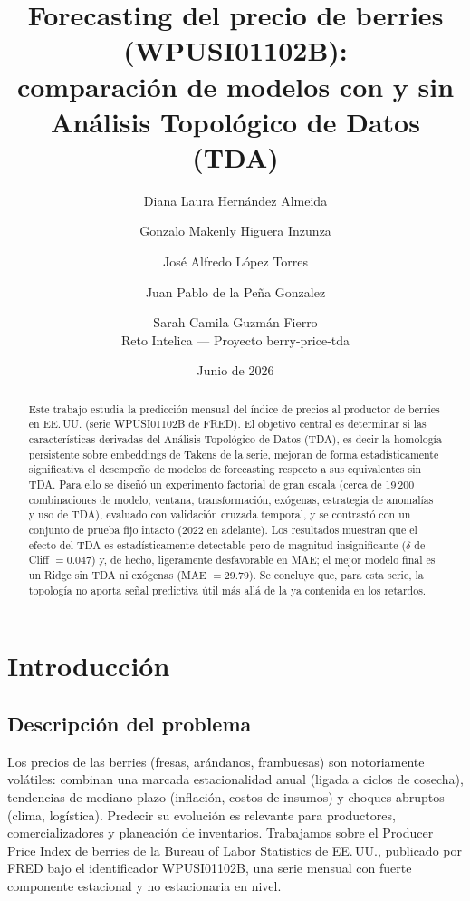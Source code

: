 \documentclass[11pt,a4paper]{article}
\title{Forecasting del precio de berries (WPUSI01102B):\\
comparación de modelos con y sin Análisis Topológico de Datos (TDA)}
\author{Diana Laura Hernández Almeida \and Gonzalo Makenly Higuera Inzunza \and
José Alfredo López Torres \and Juan Pablo de la Peña Gonzalez \and
Sarah Camila Guzmán Fierro \\[0.5em] Reto Intelica --- Proyecto berry-price-tda}
\date{Junio de 2026}
\begin{document}
\maketitle

\begin{abstract}
\noindent
Este trabajo estudia la predicción mensual del índice de precios al productor
de berries en EE.\,UU. (serie WPUSI01102B de FRED). El objetivo central es
determinar si las características derivadas del Análisis Topológico de Datos
(TDA), es decir la homología persistente sobre embeddings de Takens de la serie,
mejoran de forma estadísticamente significativa el desempeño de modelos de
forecasting respecto a sus equivalentes sin TDA. Para ello se diseñó un
experimento factorial de gran escala (cerca de 19\,200 combinaciones de modelo,
ventana, transformación, exógenas, estrategia de anomalías y uso de TDA),
evaluado con validación cruzada temporal, y se contrastó con un conjunto de
prueba fijo intacto (2022 en adelante). Los resultados muestran que el efecto del
TDA es estadísticamente detectable pero de magnitud insignificante
($\delta$ de Cliff $=0.047$) y, de hecho, ligeramente desfavorable en MAE; el
mejor modelo final es un Ridge sin TDA ni exógenas (MAE $=29.79$). Se concluye
que, para esta serie, la topología no aporta señal predictiva útil más allá de la
ya contenida en los retardos.
\end{abstract}

\section{Introducción}

\subsection{Descripción del problema}
Los precios de las berries (fresas, arándanos, frambuesas) son notoriamente
volátiles: combinan una marcada estacionalidad anual (ligada a ciclos de
cosecha), tendencias de mediano plazo (inflación, costos de insumos) y choques
abruptos (clima, logística). Predecir su evolución es relevante para
productores, comercializadores y planeación de inventarios. Trabajamos sobre el
Producer Price Index de berries de la Bureau of Labor Statistics de EE.\,UU.,
publicado por FRED bajo el identificador WPUSI01102B, una serie mensual con
fuerte componente estacional y no estacionaria en nivel.
\end{document}
